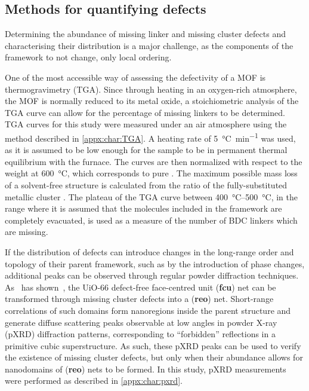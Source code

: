 \subsection{Methods for quantifying defects}

Determining the abundance of missing linker and missing cluster 
defects and characterising their distribution is a major challenge,
as the components of the framework to not change, only local
ordering.

One of the most accessible way of assessing the defectivity of
a MOF is thermogravimetry (TGA). Since through heating in
an oxygen-rich atmosphere, the MOF is normally reduced to
its metal oxide, a stoichiometric analysis of the TGA curve
can allow for the percentage of missing linkers to be
determined. TGA curves for this study were measured under
an air atmosphere using the method described in \autoref{appx:char:TGA}.
A heating rate of \SI{5}{\degreeCelsius\per\minute} was used,
as it is assumed to be low enough for the sample to be in
permanent thermal equilibrium with the furnace.
The curves are then normalized with respect to the weight at
\SI{600}{\degreeCelsius}, which corresponds to pure
. The maximum possible mass loss of a solvent-free
structure is calculated from the ratio of the fully-substituted
metallic cluster . The plateau
of the TGA curve between \SIrange{400}{500}{\degreeCelsius},
in the range where it is assumed that the molecules included in
the framework are completely evacuated, is used as a measure of the
number of BDC linkers which are missing.

If the distribution of defects can introduce changes in the
long-range order and topology of their parent framework,
such as by the introduction of phase changes,
additional peaks can be observed through regular
powder diffraction techniques.
As~\citeauthor{cliffeCorrelatedDefectNanoregions2014} has
shown~\cite{cliffeCorrelatedDefectNanoregions2014},
the UiO-66 defect-free face-centred unit (\textbf{fcu})
net can be transformed through missing cluster defects into
a (\textbf{reo}) net. Short-range correlations of such domains
form nanoregions inside the parent structure and generate
diffuse scattering peaks observable at low angles in
powder X-ray (pXRD) diffraction patterns, corresponding to ``forbidden''
reflections in a primitive cubic superstructure.
As such, these pXRD peaks can be used to verify the existence of
missing cluster defects, but only when their abundance allows for
nanodomains of (\textbf{reo}) nets to be formed. In this study,
pXRD measurements were performed as described in \autoref{appx:char:pxrd}.

